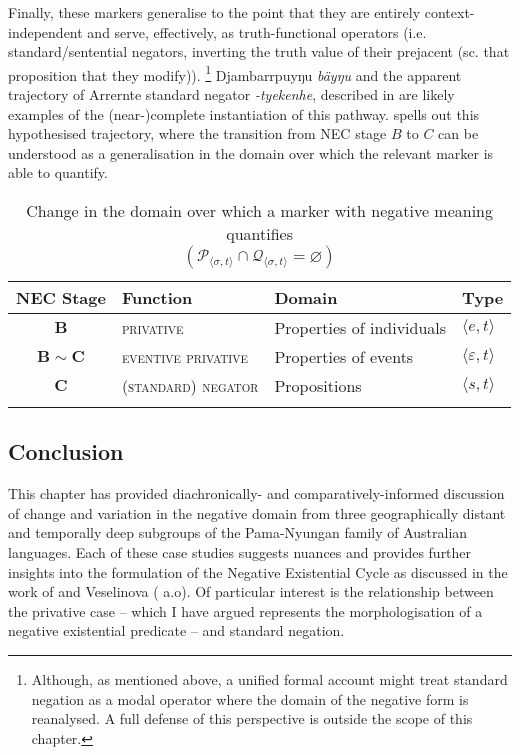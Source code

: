 \documentclass[output=paper,draft,draftmode,colorlinks,citecolor=brown]{langscibook}
\begin{document}
Finally, these markers generalise to the point that they are entirely
    context-independent and serve, effectively, as truth-functional
    operators (i.e. standard\slash sentential negators, inverting the truth
    value of their prejacent (sc. that proposition that they modify)).%
%
\footnote{Although, as mentioned above, a unified formal account might treat standard negation as a modal operator where the domain of the negative form is reanalysed. A full defense of this perspective is outside the scope of this chapter.} 
Djambarrpuyŋu \textit{bäyŋu} and the apparent trajectory of Arrernte
    standard negator \textit{-tyekenhe}, described in 
    are likely examples of the (near-)complete instantiation of this
    pathway.  spells out this hypothesised trajectory, where the transition from NEC stage $ B $ to $ C $ can be understood as a generalisation in the domain over which the relevant marker is able to quantify.

\begin{table}
	\caption{Change in the domain over which a marker with negative meaning quantifies\\$(\mathcal P_{\langle\sigma,t\rangle}\cap\mathcal Q_{\langle\sigma,t\rangle}=\varnothing )$}\label{tab:austr-domain-change}\centering
\begin{tabularx}{\textwidth}{cXll}
\lsptoprule
\textbf{NEC Stage} &	\textbf{Function} & \textbf{Domain} &
    \textbf{Type}\\\midrule
$ \boldsymbol{B} $ &	\textsc{privative}	& Properties of individuals&$ \langle e,t\rangle $\\
 $ \boldsymbol{B\!\sim\!C} $&	\textsc{eventive privative}& Properties of events&$ \langle\varepsilon,t\rangle $ \\
 $ \boldsymbol{C} $ &	\textsc{(standard) negator}& Propositions & $
    \langle s,t\rangle $\\\lspbottomrule
\end{tabularx}
\end{table}

\subsection{Conclusion}

This chapter has provided diachronically- and comparatively-informed discussion of change and variation in the negative domain from three geographically distant and temporally deep subgroups of the Pama-Nyungan family of Australian languages. Each of these case studies suggests nuances and provides further insights into the formulation of the Negative Existential Cycle as discussed in the work of \citet{Croft1991} and Veselinova (\citeyear{Veselinova2016} a.o). Of particular interest is the relationship between the privative case -- which I have argued represents the morphologisation of a negative existential predicate -- and standard negation.
\end{document}
